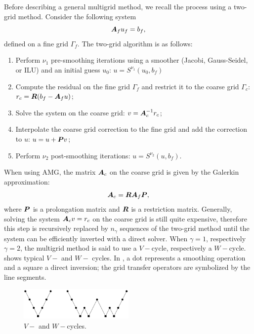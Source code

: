 Before describing a general multigrid method, we recall the process using a 
two-grid method. Consider the following system
\begin{equation}
  \boldsymbol{A}_f u_f = b_f,
\end{equation}
defined on a fine grid $\Gamma_f$. The two-grid algorithm is as follows:
\begin{enumerate}
  \item Perform $\nu_1$ pre-smoothing iterations using a smoother (Jacobi,
    Gauss-Seidel, or ILU) and an initial guess $u_0$: $u = S^{\nu_1}(u_0,b_f)$
  \item Compute the residual on the fine grid $\Gamma_f$ and restrict it to
    the coarse grid $\Gamma_c$: $r_c = \boldsymbol{R}(b_f-\boldsymbol{A}_f u)$;
  \item Solve the system on the coarse grid: $v=\boldsymbol{A}_c^{-1} r_c$;
  \item Interpolate the coarse grid correction to the fine grid and add the
    correction to $u$: $u=u+\boldsymbol{P}v$;
  \item Perform $\nu_2$ post-smoothing iterations: $u = S^{\nu_2}(u,b_f)$.
\end{enumerate}
When using AMG, the matrix $\boldsymbol{A}_c$ on the coarse grid is given by the
Galerkin approximation:
\begin{equation}
  \boldsymbol{A}_c = \boldsymbol{R} \boldsymbol{A}_f \boldsymbol{P},
\end{equation}
where $\boldsymbol{P}$ is a prolongation matrix and $\boldsymbol{R}$ is a restriction matrix. 
Generally, solving the system $\boldsymbol{A}_c v = r_c$ on the coarse grid is still
quite expensive, therefore this step is recursively replaced by $n_{\gamma}$
sequences of the two-grid method until the system can be efficiently inverted 
with a direct solver.
When $\gamma = 1$, respectively $\gamma =
2$, the multigrid method is said to use a $V-$cycle, respectively a $W-$cycle. 
 shows typical $V-$ and $W-$ cycles. In , a 
dot represents a smoothing operation and a square a
direct inversion; the grid transfer operators are symbolized by the line segments.
\begin{figure}[H]
  \centering
  \includegraphics[width=0.5\textwidth]{v_w_cycles}
  \caption{$V-$ and $W-$cycles.}
  \label{fig_v_w}
\end{figure}

